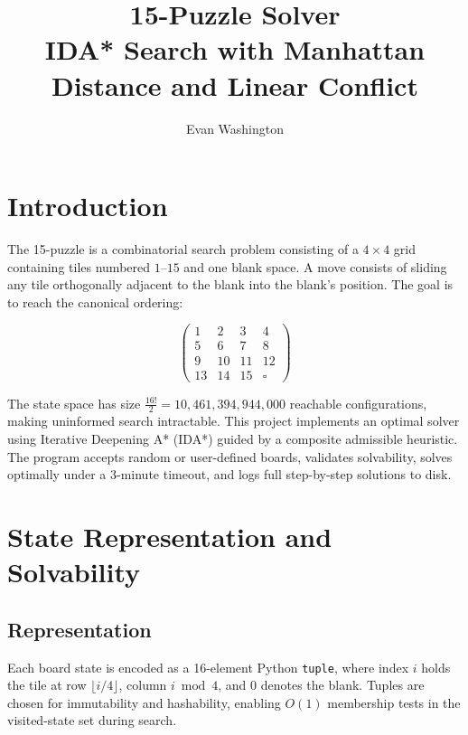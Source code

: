 \documentclass[11pt]{article}
\title{
	\LARGE\textbf{15-Puzzle Solver} \\[0.4em]
	\large IDA* Search with Manhattan Distance and Linear Conflict
}
\author{Evan Washington}
\date{}
\begin{document}
	
	\maketitle
	
	\section{Introduction}
	
	The 15-puzzle is a combinatorial search problem consisting of a $4 \times 4$ 
	grid containing tiles numbered $1$--$15$ and one blank space. A move consists 
	of sliding any tile orthogonally adjacent to the blank into the blank's 
	position. The goal is to reach the canonical ordering:
	
	\[
	\begin{pmatrix}
		1 & 2 & 3 & 4 \\
		5 & 6 & 7 & 8 \\
		9 & 10 & 11 & 12 \\
		13 & 14 & 15 & \square
	\end{pmatrix}
	\]
	
	The state space has size $\frac{16!}{2} = 10{,}461{,}394{,}944{,}000$ reachable 
	configurations, making uninformed search intractable. This project implements 
	an optimal solver using Iterative Deepening A* (IDA*) guided by a composite 
	admissible heuristic. The program accepts random or user-defined boards, 
	validates solvability, solves optimally under a 3-minute timeout, and logs 
	full step-by-step solutions to disk.
	
	\section{State Representation and Solvability}
	
	\subsection{Representation}
	
	Each board state is encoded as a 16-element Python \texttt{tuple}, where index 
	$i$ holds the tile at row $\lfloor i/4 \rfloor$, column $i \bmod 4$, and 
	$0$ denotes the blank. Tuples are chosen for immutability and hashability, 
	enabling $O(1)$ membership tests in the visited-state set during search.
	
\end{document}
